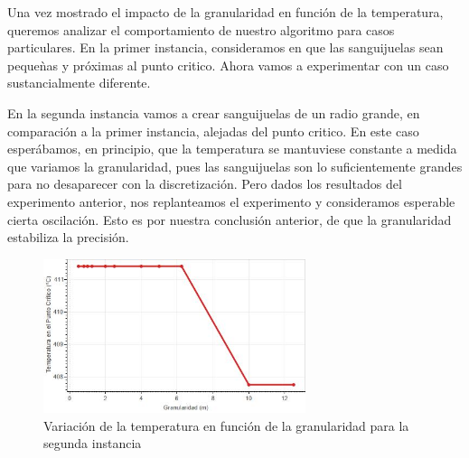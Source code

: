 Una vez mostrado el impacto de la granularidad en función de la temperatura, queremos analizar el comportamiento de nuestro algoritmo para casos particulares. En la primer instancia, consideramos en que las sanguijuelas sean peque\`nas y próximas al punto critico. Ahora vamos a experimentar con un caso sustancialmente diferente. 

En la segunda instancia vamos a crear sanguijuelas de un radio grande, en comparación a la primer instancia, alejadas del punto critico. En este caso esperábamos, en principio, que la temperatura se mantuviese constante a medida que variamos la granularidad, pues las sanguijuelas son lo suficientemente grandes para no desaparecer con la discretizaci\'on. Pero dados los resultados del experimento anterior, nos replanteamos el experimento y consideramos esperable cierta oscilación. Esto es por nuestra conclusión anterior, de que la granularidad estabiliza la precisión. 

\begin{figure}[h]
    \includegraphics[width=0.685\textwidth]{experimento 1-2}
    \caption{Variación de la temperatura en función de la granularidad para la segunda instancia}
    \label{fig:exp12}
\end{figure}